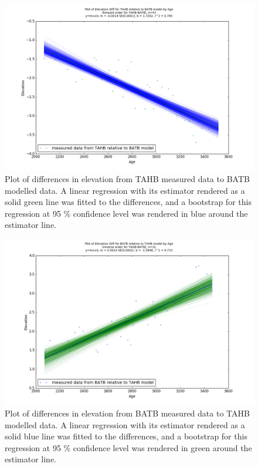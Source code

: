 \newpage

\begin{figure}[H]
	\includegraphics[width=1.3\linewidth, angle=270 ]{data/bothNonZero/withinSeventyFivePercent/gias/theGIA_TAHB_relative_to_BATB.png}
	\caption{Plot of differences in elevation from TAHB measured data to BATB modelled data. A linear regression with its estimator rendered as
	 a solid green line was fitted to the differences, and a bootstrap for this regression at 95 \% confidence level was rendered in blue
	 around the estimator line.}
	\label{fig:gias_TAHBxBATB}
\end{figure}
\newpage


\begin{figure}[H]
	\includegraphics[width=1.3\linewidth, angle=270 ]{data/bothNonZero/withinSeventyFivePercent/gias/theGIA_BATB_relative_to_TAHB.png}
	\caption{Plot of differences in elevation from BATB measured data to TAHB modelled data. A linear regression with its estimator rendered as
	 a solid blue line was fitted to the differences, and a bootstrap for this regression at 95 \% confidence level was rendered in green
	 around the estimator line.}
	\label{fig:gias_BATBxTAHB}
\end{figure}
\newpage






